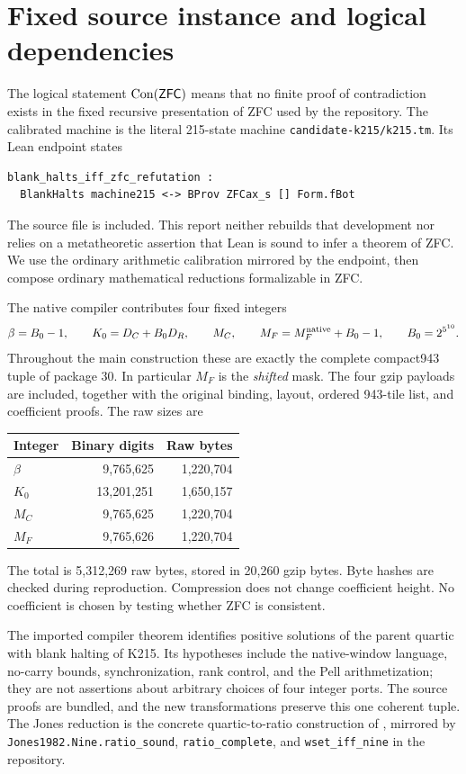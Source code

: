 \documentclass[11pt]{article}
\theoremstyle{remark}\newtheorem{remark}[theorem]{Remark}
\begin{document}
\section{Fixed source instance and logical dependencies}\label{sec:binding}
The logical statement $\operatorname{Con}(\mathsf{ZFC})$ means that no finite proof of contradiction
exists in the fixed recursive presentation of ZFC used by the repository.
The calibrated machine is the literal 215-state machine
\texttt{candidate-k215/k215.tm}. Its Lean endpoint states
\begin{lstlisting}
blank_halts_iff_zfc_refutation :
  BlankHalts machine215 <-> BProv ZFCax_s [] Form.fBot
\end{lstlisting}
The source file is included. This report neither rebuilds that development
nor relies on a metatheoretic assertion that Lean is sound to infer a theorem
of ZFC. We use the ordinary arithmetic calibration mirrored by the endpoint,
then compose ordinary mathematical reductions formalizable in ZFC.

The native compiler contributes four fixed integers
\[
 \beta=B_0-1,\qquad K_0=D_C+B_0D_R,\qquad M_C,\qquad
 M_F=M_F^{\rm native}+B_0-1,\qquad B_0=2^{5^{10}}.
\]
Throughout the main construction these are exactly the complete compact943
tuple of package 30. In particular $M_F$ is the \emph{shifted} mask. The
four gzip payloads are included, together with the original binding, layout,
ordered 943-tile list, and coefficient proofs. The raw sizes are
\begin{center}\small
\begin{tabular}{lrr}
\toprule Integer & Binary digits & Raw bytes\\\midrule
$\beta$ & 9,765,625 & 1,220,704\\
$K_0$ & 13,201,251 & 1,650,157\\
$M_C$ & 9,765,625 & 1,220,704\\
$M_F$ & 9,765,626 & 1,220,704\\\bottomrule
\end{tabular}\end{center}
The total is 5,312,269 raw bytes, stored in 20,260 gzip bytes. Byte hashes
are checked during reproduction. Compression does not change coefficient
height. No coefficient is chosen by testing whether ZFC is consistent.

The imported compiler theorem identifies positive solutions of the parent
quartic with blank halting of K215. Its hypotheses include the native-window
language, no-carry bounds, synchronization, rank control, and the Pell
arithmetization; they are not assertions about arbitrary choices of four
integer ports. The source proofs are bundled, and the new transformations
preserve this one coherent tuple. The Jones reduction is the concrete
quartic-to-ratio construction of \cite{jones}, mirrored by
\texttt{Jones1982.Nine.ratio\_sound},
\texttt{ratio\_complete}, and \texttt{wset\_iff\_nine} in the repository.
\end{document}
